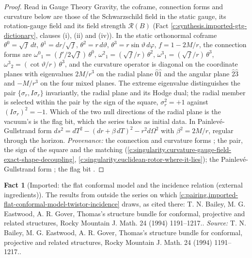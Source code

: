 \documentclass[11pt]{article}
\theoremstyle{definition}
\newtheorem{fact}[theorem]{Fact}
\theoremstyle{plain}
\begin{document}
\begin{proof}
Read in Gauge Theory Gravity, the coframe, connection forms and curvature below are those of the Schwarzschild field in the static gauge, its rotation-gauge field and its field strength $\mathcal{R}(B)$ (Fact \ref{c:synthesis.imported-gtg-dictionary}, clauses (i), (ii) and (iv)). In the static orthonormal coframe $\theta^{0} = \sqrt f\,dt$, $\theta^{1} = dr/\sqrt f$, $\theta^{2} = r\,d\vartheta$, $\theta^{3} = r\sin\vartheta\,d\varphi$, $f = 1 - 2M/r$, the connection forms are $\omega^{0}{}_{1} = (f'/2\sqrt f)\,\theta^{0}$, $\omega^{2}{}_{1} = (\sqrt f/r)\,\theta^{2}$, $\omega^{3}{}_{1} = (\sqrt f/r)\,\theta^{3}$, $\omega^{3}{}_{2} = (\cot\vartheta/r)\,\theta^{3}$, and the curvature operator is diagonal on the coordinate planes with eigenvalues $2M/r^{3}$ on the radial plane $\hat0\hat1$ and the angular plane $\hat2\hat3$ and $-M/r^{3}$ on the four mixed planes. The extreme eigenvalue distinguishes the pair $\{\sigma_{r}, I\sigma_{r}\}$ invariantly, the radial plane and its Hodge dual; the radial member is selected within the pair by the sign of the square, $\sigma_{r}^{2} = +1$ against $(I\sigma_{r})^{2} = -1$. Which of the two null directions of the radial plane is the vacuum's is the flag bit, which the series takes as initial data. In Painlev\'e-Gullstrand form $ds^{2} = dT^{2} - (dr + \beta\,dT)^{2} - r^{2}d\Omega^{2}$ with $\beta^{2} = 2M/r$, regular through the horizon. \emph{Provenance:} the connection and curvature forms \cite[App.~A.2]{ButlerT5}; the pair, the sign of the square and the matching \cite[Thm.~6.1, Prop.~7.21(3)]{ButlerT5} (\ref{c:singularity.curvature-gauge-field-exact-shape-decoupling}, \ref{c:singularity.euclidean-rotor-where-it-lies}); the Painlev\'e-Gullstrand form \cite[App.~A.1]{ButlerT5}; the flag bit \cite[Def.~2.10, Prop.~5.1]{ButlerT14}.

\end{proof}

\begin{fact}[Imported: the flat conformal model and the incidence relation (external ingredients)]\label{c:pairing.imported-flat-conformal-model-twistor-incidence-external}
The results from outside the series on which \ref{c:pairing.imported-flat-conformal-model-twistor-incidence} draws, as cited there: T. N. Bailey, M. G. Eastwood, A. R. Gover, Thomas's structure bundle for conformal, projective and related structures, Rocky Mountain J. Math. 24 (1994) 1191--1217..
\emph{Source:} T. N. Bailey, M. G. Eastwood, A. R. Gover, Thomas's structure bundle for conformal, projective and related structures, Rocky Mountain J. Math. 24 (1994) 1191--1217..
\end{fact}
\end{document}
